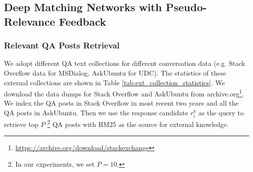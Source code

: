
\subsection{Deep Matching Networks with Pseudo-Relevance Feedback}
\label{sec:method_dmn_prf}

\subsubsection{\textbf{Relevant QA Posts Retrieval}} %
We adopt different QA text collections for different conversation data (e.g. Stack Overflow data for MSDialog, AskUbuntu for UDC). The statistics of these external collections are shown in Table \ref{tab:ext_collection_statistics}. We download the data dumps for Stack Overflow and AskUbuntu from archive.org\footnote{\url{https://archive.org/download/stackexchange}}. We index the QA posts in Stack Overflow in most recent two years and all the QA posts in AskUbuntu. Then we use the response candidate $ r_i^k$ as the query to retrieve top $P$ \footnote{In our experiments, we set $P=10$.} QA posts with BM25 as the source for external knowledge. %

